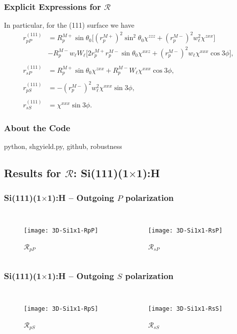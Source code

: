 \documentclass{beamer}
\begin{document}
\begin{frame}
\frametitle{Explicit Expressions for $\mathcal{R}$}
In particular, for the (111) surface we have
\begin{align*}
r^{(111)}_{pP} &= 
R^{M+}_{p}\sin\theta_{0}
\Big[
  \left(r^{M+}_{p}\right)^{2}\sin^{2}\theta_{0}\chi^{zzz}
+ \left(r^{M-}_{p}\right)^{2}w^{2}_{\ell}\chi^{zxx}
\Big]\\
&- R^{M-}_{p}w_{\ell}W_{\ell}
\Big[
  2r^{M+}_{p}r^{M-}_{p}\sin\theta_{0}\chi^{xxz}
+ \left(r^{M-}_{p}\right)^{2}w_{\ell}\chi^{xxx}\cos3\phi
\Big],\\\\
r^{(111)}_{sP} &= 
R^{M+}_{p}\sin\theta_{0}\chi^{zxx} +
R^{M-}_{p}W_{\ell}\chi^{xxx}\cos3\phi,\\\\
r^{(111)}_{pS} &= - \left(r^{M-}_{p}\right)^{2}w^{2}_{\ell}\chi^{xxx}\sin3\phi,\\\\
r^{(111)}_{sS} &= \chi^{xxx}\sin3\phi.
\end{align*}
\end{frame}

\begin{frame}
\frametitle{About the Code}
python, shgyield.py, github, robustness
\end{frame}



\subsection{Results for \texorpdfstring{$\mathcal{R}$}{R}: 
Si(111)(1\texorpdfstring{$\times$}{x}1):H}

\begin{frame}
\frametitle{Si(111)(1\texorpdfstring{$\times$}{x}1):H -- Outgoing
\texorpdfstring{$P$}{P} polarization}
\begin{columns}
\begin{figure}
\centering
\texttt{[image: 3D-Si1x1-RpP]}
\caption{$\mathcal{R}_{pP}$}
\end{figure}
\begin{figure}
\centering
\texttt{[image: 3D-Si1x1-RsP]}
\caption{$\mathcal{R}_{sP}$}
\end{figure}
\end{columns}
\end{frame}

\begin{frame}
\frametitle{Si(111)(1\texorpdfstring{$\times$}{x}1):H -- Outgoing
\texorpdfstring{$S$}{S} polarization}
\begin{columns}
\begin{figure}
\centering
\texttt{[image: 3D-Si1x1-RpS]}
\caption{$\mathcal{R}_{pS}$}
\end{figure}
\begin{figure}
\centering
\texttt{[image: 3D-Si1x1-RsS]}
\caption{$\mathcal{R}_{sS}$}
\end{figure}
\end{columns}
\end{frame}
\end{document}
